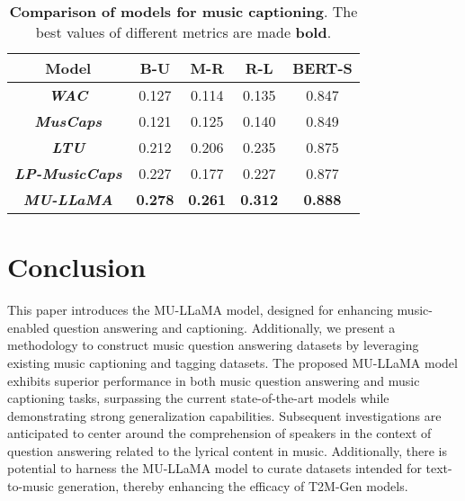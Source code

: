 \documentclass{article}
\begin{document}
\begin{table}[ht!]
\centering
\def\arraystretch{1.1}\caption{\textbf{Comparison of models for music captioning}. The best values of different metrics are made \textbf{bold}.}
\begin{tabular}{c|c|c|c|c}
\hline\hline
Model & \textbf{B-U} & \textbf{M-R} & \textbf{R-L} & \textbf{BERT-S} \\ \hline\hline
\textit{\textbf{WAC}} & 0.127 & 0.114 & 0.135 & 0.847 \\
\textit{\textbf{MusCaps}} & 0.121 & 0.125 & 0.140 & 0.849 \\
\textit{\textbf{LTU}} & 0.212 & 0.206 & 0.235 & 0.875 \\
\textit{\textbf{LP-MusicCaps}} & 0.227 & 0.177 & 0.227 & 0.877 \\
\textit{\textbf{MU-LLaMA}} & \textbf{0.278} & \textbf{0.261} & \textbf{0.312} & \textbf{0.888}\\ \hline\hline
\end{tabular}
\label{musiccap_eval}
\end{table}

\vspace{-0.5cm}
\section{Conclusion}
\label{sec:conclusion}

This paper introduces the MU-LLaMA model, designed for enhancing music-enabled question answering and captioning. Additionally, we present a methodology to construct music question answering datasets by leveraging existing music captioning and tagging datasets. The proposed MU-LLaMA model exhibits superior performance in both music question answering and music captioning tasks, surpassing the current state-of-the-art models while demonstrating strong generalization capabilities. Subsequent investigations are anticipated to center around the comprehension of speakers in the context of question answering related to the lyrical content in music. Additionally, there is potential to harness the MU-LLaMA model to curate datasets intended for text-to-music generation, thereby enhancing the efficacy of T2M-Gen models.

\vfill\pagebreak





{\small
}
\end{document}
